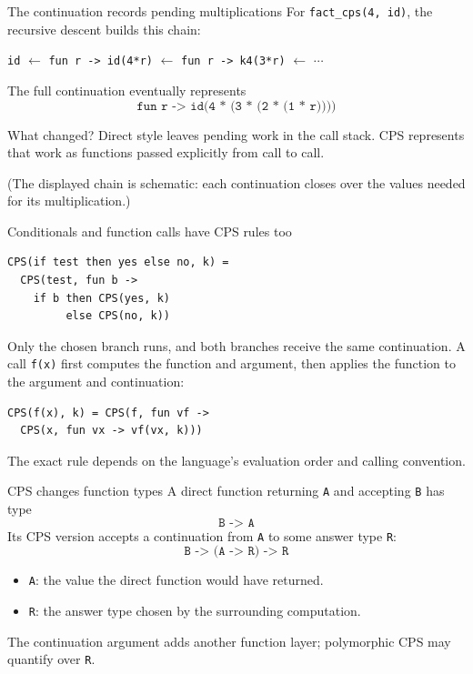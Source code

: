 \documentclass[aspectratio=169,10pt]{beamer}
\begin{document}
\begin{frame}{The continuation records pending multiplications}
  For \texttt{fact\_cps(4, id)}, the recursive descent builds this chain:
  \begin{center}
    \texttt{id} $\leftarrow$ \texttt{fun r -> id(4*r)} $\leftarrow$
    \texttt{fun r -> k4(3*r)} $\leftarrow$ $\cdots$
  \end{center}
  \vspace{0.6em}
  The full continuation eventually represents
  \[
    \texttt{fun r -> id(4 * (3 * (2 * (1 * r))))}
  \]
  \begin{block}{What changed?}
    Direct style leaves pending work in the call stack. CPS represents that
    work as functions passed explicitly from call to call.
  \end{block}
  \small (The displayed chain is schematic: each continuation closes over
  the values needed for its multiplication.)
\end{frame}

\begin{frame}[fragile]{Conditionals and function calls have CPS rules too}
  \begin{lstlisting}
CPS(if test then yes else no, k) =
  CPS(test, fun b ->
    if b then CPS(yes, k)
         else CPS(no, k))
  \end{lstlisting}
  Only the chosen branch runs, and both branches receive the same continuation.
  \vspace{0.5em}
  A call \texttt{f(x)} first computes the function and argument, then applies
  the function to the argument and continuation:
  \begin{lstlisting}
CPS(f(x), k) = CPS(f, fun vf ->
  CPS(x, fun vx -> vf(vx, k)))
  \end{lstlisting}
  The exact rule depends on the language's evaluation order and calling convention.
\end{frame}

\begin{frame}{CPS changes function types}
  A direct function returning \texttt{A} and accepting \texttt{B} has type
  \[
    \texttt{B -> A}
  \]
  Its CPS version accepts a continuation from \texttt{A} to some answer type \texttt{R}:
  \[
    \texttt{B -> (A -> R) -> R}
  \]
  \begin{itemize}
    \item \texttt{A}: the value the direct function would have returned.
    \item \texttt{R}: the answer type chosen by the surrounding computation.
  \end{itemize}
  The continuation argument adds another function layer; polymorphic CPS may
  quantify over \texttt{R}.
\end{frame}
\end{document}
